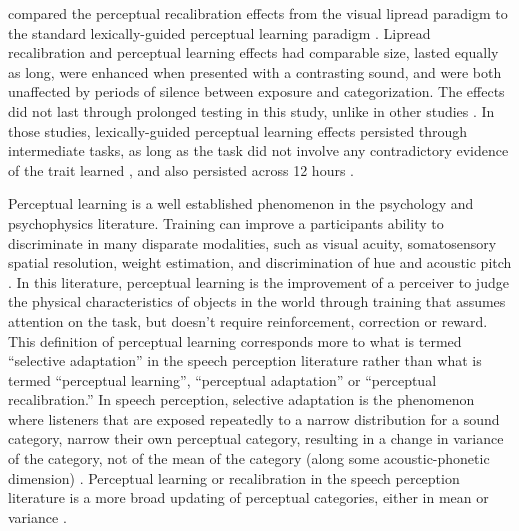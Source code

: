 \citet{vanLinden2007} compared the perceptual recalibration effects from the visual lipread paradigm \citep{Bertelson2003} to the standard lexically-guided perceptual learning paradigm \citep{Norris2003}.  
Lipread recalibration and perceptual learning effects had comparable size, lasted equally as long, were enhanced when presented with a contrasting sound, and were both unaffected by periods of silence between exposure and categorization.  
The effects did not last through prolonged testing in this study, unlike in other studies \citep{Kraljic2005,Eisner2006}.
In those studies, lexically-guided perceptual learning effects persisted through intermediate tasks, as long as the task did not involve any contradictory evidence of the trait learned \citep{Kraljic2005}, and also persisted across 12 hours \citep{Eisner2006}.

Perceptual learning is a well established phenomenon in the psychology and psychophysics literature. 
Training can improve a participants ability to discriminate in many disparate modalities, such as visual acuity, somatosensory spatial resolution, weight estimation, and discrimination of hue and acoustic pitch \citep[for review]{Gibson1953}. 
In this literature, perceptual learning is the improvement of a perceiver to judge the physical characteristics of objects in the world through training that assumes attention on the task, but doesn't require reinforcement, correction or reward.
This definition of perceptual learning corresponds more to what is termed ``selective adaptation'' in the speech perception literature rather than what is termed ``perceptual learning'', ``perceptual adaptation'' or ``perceptual recalibration.''  
In speech perception, selective adaptation is the phenomenon where listeners that are exposed repeatedly to a narrow distribution for a sound category, narrow their own perceptual category, resulting in a change in variance of the category, not of the mean of the category (along some acoustic-phonetic dimension) \citep{Eimas1973,Samuel1986,Vroomen2007}.
Perceptual learning or recalibration in the speech perception literature is a more broad updating of perceptual categories, either in mean or variance \citep{Norris2003, Vroomen2007}.

